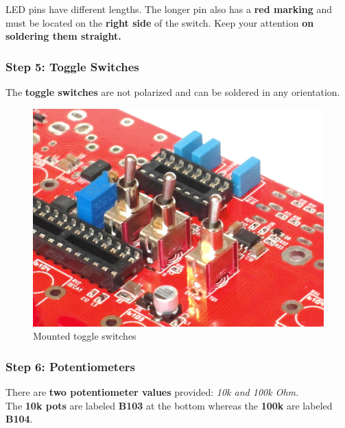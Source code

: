 \documentclass{scrartcl}
\begin{document}
LED pins have different lengths. The longer pin also has a \textbf{red marking} and must be located on the \textbf{right side} of the switch.
Keep your attention \textbf{on soldering them straight.}

\subsubsection{Step 5: Toggle Switches}

The \textbf{toggle switches} are not polarized and can be soldered in any orientation.

\begin{figure}[!ht]
    \begin{center}
        \includegraphics[scale=0.25]{assets/pcb-toggles.jpg}
        \caption{Mounted toggle switches}
    \end{center}
\end{figure}

\subsubsection{Step 6: Potentiometers}

There are \textbf{two potentiometer values} provided: \emph{10k and 100k Ohm.} \\
The \textbf{10k pots} are labeled \textbf{B103} at the bottom whereas the \textbf{100k} are labeled \textbf{B104}.
\end{document}
